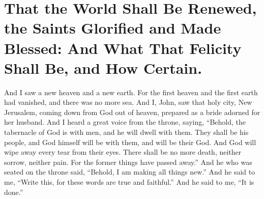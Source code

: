 \chapter[Sermon 91. That the World Shall Be Renewed, the Saints Glorified and Made Blessed: And What That Felicity Shall Be, and How Certain.]{That the World Shall Be Renewed, the Saints Glorified and Made Blessed: And What That Felicity Shall Be, and How Certain.}
\label{sermon:091}

And I saw a new heaven and a new earth. For the first heaven and the first earth had vanished, and there was no more sea. And I, John, saw that holy city, New Jerusalem, coming down from God out of heaven, prepared as a bride adorned for her husband. And I heard a great voice from the throne, saying, “Behold, the tabernacle of God is with men, and he will dwell with them. They shall be his people, and God himself will be with them, and will be their God. And God will wipe away every tear from their eyes. There shall be no more death, neither sorrow, neither pain. For the former things have passed away.” And he who was seated on the throne said, “Behold, I am making all things new.” And he said to me, “Write this, for these words are true and faithful.” And he said to me, “It is done.”

